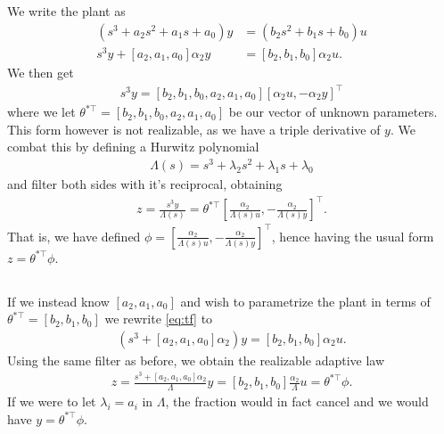 \documentclass[]{article}
\title{}
\author{Sigurd Totland | MTTK}
\begin{document}
\maketitle

\section{}
\subsection{}
We  write the plant as
\begin{align}
\label{eq:tf}
(s^3 + a_2 s^2 + a_1 s + a_0) y &= (b_2 s^2 + b_1 s + b_0)u \\
s^3 y + [a_2, a_1, a_0] \alpha_2 y &= [b_2, b_1, b_0] \alpha_2 u.
\end{align}
We then get
\begin{equation}\begin{aligned}
s^3 y = [b_2, b_1, b_0, a_2, a_1, a_0] [\alpha_2 u, -\alpha_2 y]^\top
\end{aligned}\end{equation}
where we let $\theta^{*\top} = [b_2, b_1, b_0, a_2, a_1, a_0]$ be our vector of unknown parameters. This form however is not realizable, as we have a triple derivative of $y$. We combat this by defining a Hurwitz polynomial
\begin{equation}\begin{aligned}
\Lambda(s) = s^3 + \lambda_2s^2 + \lambda_1 s + \lambda_0
\end{aligned}\end{equation}
and filter both sides with it's reciprocal, obtaining
\begin{equation}\begin{aligned}
z = \frac{s^3y}{\Lambda(s)}  = \theta^{*\top} [\frac{\alpha_2}{\Lambda(s) u}, -\frac{\alpha_2}{\Lambda(s)y}]^\top.
\end{aligned}\end{equation}
That is, we have defined $\phi = [\frac{\alpha_2}{\Lambda(s) u}, -\frac{\alpha_2}{\Lambda(s)y}]^\top$, hence having the usual form $z = \theta^{*\top}\phi$.
\subsection{}
If we instead know $[a_2, a_1, a_0]$ and wish to parametrize the plant in terms of $\theta^{*\top} = [b_2, b_1, b_0]$ we rewrite \eqref{eq:tf} to
\begin{equation}\begin{aligned}
(s^3 + [a_2, a_1, a_0] \alpha_2)y = [b_2, b_1, b_0] \alpha_2 u.
\end{aligned}\end{equation}
Using the same filter as before, we obtain the realizable adaptive law
\begin{equation}\begin{aligned}
z = \frac{s^3 + [a_2, a_1, a_0]\alpha_2}{\Lambda}y = [b_2, b_1, b_0] \frac{\alpha_2}{\Lambda} u = \theta^{*\top}\phi.
\end{aligned}\end{equation}
If we were to let $\lambda_i = a_i$ in $\Lambda$, the fraction would in fact cancel and we would have $y = \theta^{*\top}\phi$.
\end{document}
